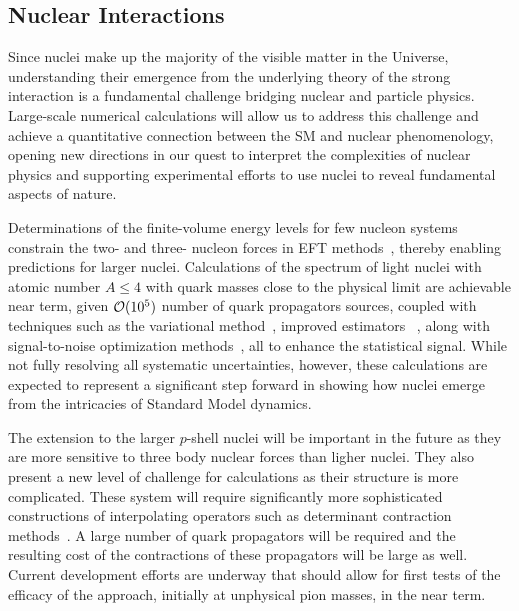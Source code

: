 \subsection{Nuclear Interactions}

Since nuclei make up the majority of the visible matter in the Universe, understanding their emergence from the underlying theory of the strong interaction is a fundamental challenge bridging nuclear and particle physics. Large-scale numerical calculations will allow us to address this challenge and achieve a quantitative connection between the SM and nuclear phenomenology, opening new directions in our quest to interpret the complexities of nuclear physics and supporting experimental efforts to use nuclei to reveal fundamental aspects of nature.

Determinations of the finite-volume energy levels for few nucleon systems constrain the two- and three- nucleon forces in EFT methods~\cite{Barnea:2013uqa}, thereby enabling predictions for larger nuclei. Calculations of the spectrum of light nuclei with atomic number $A\le 4$ with quark masses close to the physical limit are achievable near term, given ${\cal O}(10^5)$ number of quark propagators sources, coupled with techniques such as the variational method~\cite{Michael:1985ne}, improved estimators~ \cite{Beane:2014oea}, along with signal-to-noise optimization methods~\cite{Detmold:2014hla}, all to enhance the statistical signal. While not fully resolving all systematic uncertainties, however, these calculations are expected to represent a significant step forward in showing how nuclei emerge from the intricacies of Standard Model dynamics.

The extension to the larger $p$-shell nuclei will be important in the future as they are more sensitive to three body nuclear forces than ligher nuclei. They also present a new level of challenge for calculations as their structure is more complicated. These system will require significantly more sophisticated constructions of interpolating operators such as determinant contraction methods~\cite{Detmold:2012eu,Vachaspati:2014bda}. A large number of quark propagators will be required and the resulting cost of the contractions of these propagators will be large as well. Current development efforts are underway that should allow for first tests of the efficacy of the approach, initially at unphysical pion masses, in the near term.


